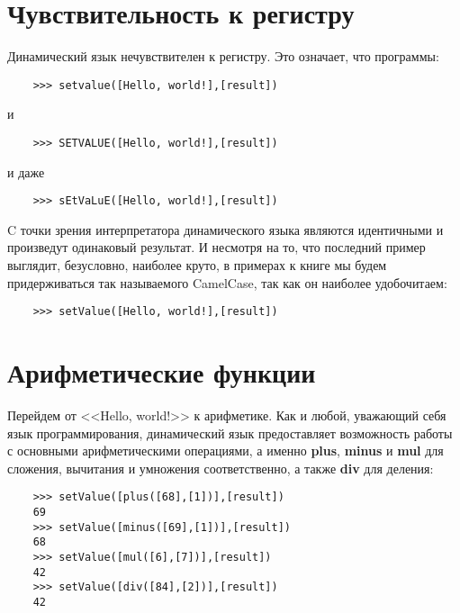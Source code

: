 \documentclass[../index.tex]{subfiles}
\begin{document}
    \section{Чувствительность к регистру}
    
    Динамический язык нечувствителен к регистру. Это означает, что программы:
    
    \begin{verbatim}
    >>> setvalue([Hello, world!],[result])
    \end{verbatim}
    
    и
    
    \begin{verbatim}
    >>> SETVALUE([Hello, world!],[result])
    \end{verbatim}
    
    и даже
    
    \begin{verbatim}
    >>> sEtVaLuE([Hello, world!],[result])
    \end{verbatim}
    
    C точки зрения интерпретатора динамического языка являются идентичными и произведут одинаковый результат. И несмотря на то, что последний пример выглядит, безусловно, наиболее круто, в примерах к книге мы будем придерживаться так называемого CamelCase, так как он наиболее удобочитаем:
    
    \begin{verbatim}
    >>> setValue([Hello, world!],[result])
    \end{verbatim}
    
    \section{Арифметические функции}
    
    Перейдем от <<Hello, world!>> к арифметике. Как и любой, уважающий себя язык программирования, динамический язык предоставляет возможность работы с основными арифметическими операциями, а именно {\bf plus}, {\bf minus} и {\bf mul} для сложения, вычитания и умножения соответственно, а также {\bf div} для деления:
    
    \begin{verbatim}
    >>> setValue([plus([68],[1])],[result])
    69
    >>> setValue([minus([69],[1])],[result])
    68
    >>> setValue([mul([6],[7])],[result])
    42
    >>> setValue([div([84],[2])],[result])
    42
    \end{verbatim}
    
\end{document}
